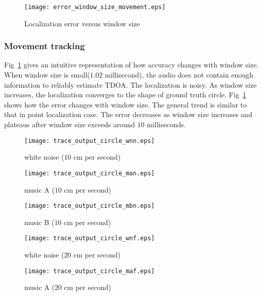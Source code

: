 \begin{figure}[]
\centering
\texttt{[image: error\_window\_size\_movement.eps]}
\caption{Localization error versus window size}
\label{fig:err_win_circle}
\end{figure}

\subsubsection{Movement tracking}

Fig~\ref{fig:err_win_circle} gives an intuitive representation of how accuracy changes with window size. When window size is small($1.02$ millisecond), the audio does not contain enough information to reliably estimate TDOA. The localization is noisy. As window size increases, the localization converges to the shape of ground truth circle. Fig~\ref{fig:err_win_circle} shows how the error changes with window size. The general trend is similar to that in point localization case. The error decreases as window size increases and plateaus after window size exceeds around $10$ milliseconds.

\begin{figure*}[]
\centering
\texttt{[image: trace\_output\_circle\_wnn.eps]}
\caption{white noise ($10$ cm per second)}
\label{fig:circle_wnn}
\end{figure*}

\begin{figure*}[]
\centering
\texttt{[image: trace\_output\_circle\_man.eps]}
\caption{music A ($10$ cm per second)}
\label{fig:circle_musican}
\end{figure*}

\begin{figure*}[]
\centering
\texttt{[image: trace\_output\_circle\_mbn.eps]}
\caption{music B ($10$ cm per second)}
\label{fig:circle_musicbn}
\end{figure*}

\begin{figure*}[]
\centering
\texttt{[image: trace\_output\_circle\_wnf.eps]}
\caption{white noise ($20$ cm per second)}
\label{fig:circle_wnf}
\end{figure*}

\begin{figure*}[]
\centering
  \texttt{[image: trace\_output\_circle\_maf.eps]}
  \caption{music A ($20$ cm per second)}
  \label{fig:circle_musicaf}
\end{figure*}

